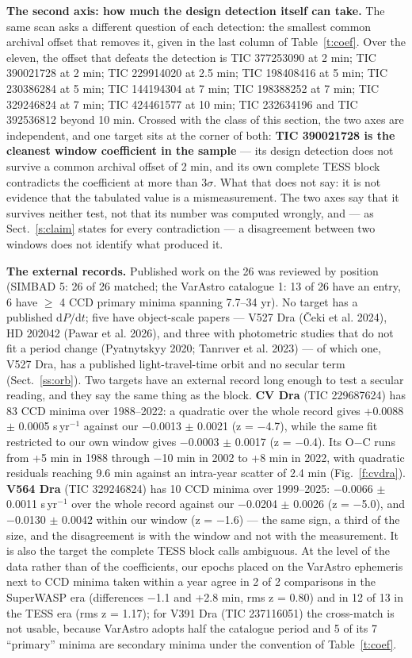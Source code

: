 \documentclass{aa}
\begin{document}
\textbf{The second axis: how much the design detection itself can take.} The same scan asks a different question of each detection: the smallest common archival offset that removes it, given in the last column of Table~\ref{t:coef}. Over the eleven, the offset that defeats the detection is TIC 377253090 at 2 min; TIC 390021728 at 2 min; TIC 229914020 at 2.5 min; TIC 198408416 at 5 min; TIC 230386284 at 5 min; TIC 144194304 at 7 min; TIC 198388252 at 7 min; TIC 329246824 at 7 min; TIC 424461577 at 10 min; TIC 232634196 and TIC 392536812 beyond 10 min. Crossed with the class of this section, the two axes are independent, and one target sits at the corner of both: \textbf{TIC 390021728 is the cleanest window coefficient in the sample} --- its design detection does not survive a common archival offset of 2 min, and its own complete TESS block contradicts the coefficient at more than 3$\sigma$. What that does not say: it is not evidence that the tabulated value is a mismeasurement. The two axes say that it survives neither test, not that its number was computed wrongly, and --- as Sect.~\ref{s:claim} states for every contradiction --- a disagreement between two windows does not identify what produced it.

\textbf{The external records.} Published work on the 26 was reviewed by position (SIMBAD 5\arcsec: 26 of 26 matched; the VarAstro catalogue 1\arcmin: 13 of 26 have an entry, 6 have $\ge$ 4 CCD primary minima spanning 7.7--34 yr). No target has a published $\mathrm{d}P/\mathrm{d}t$; five have object-scale papers --- V527 Dra (Čeki et al. 2024), HD 202042 (Pawar et al. 2026), and three with photometric studies that do not fit a period change (Pyatnytskyy 2020; Tanrıver et al. 2023) --- of which one, V527 Dra, has a published light-travel-time orbit and no secular term (Sect.~\ref{ss:orb}). Two targets have an external record long enough to test a secular reading, and they say the same thing as the block. \textbf{CV Dra} (TIC 229687624) has 83 CCD minima over 1988--2022: a quadratic over the whole record gives +0.0088 $\pm$ 0.0005 s\,yr$^{-1}$ against our $-$0.0013 $\pm$ 0.0021 (z = $-$4.7), while the same fit restricted to our own window gives $-$0.0003 $\pm$ 0.0017 (z = $-$0.4). Its O$-$C runs from +5 min in 1988 through $-$10 min in 2002 to +8 min in 2022, with quadratic residuals reaching 9.6 min against an intra-year scatter of 2.4 min (Fig.~\ref{f:cvdra}). \textbf{V564 Dra} (TIC 329246824) has 10 CCD minima over 1999--2025: $-$0.0066 $\pm$ 0.0011 s\,yr$^{-1}$ over the whole record against our $-$0.0204 $\pm$ 0.0026 (z = $-$5.0), and $-$0.0130 $\pm$ 0.0042 within our window (z = $-$1.6) --- the same sign, a third of the size, and the disagreement is with the window and not with the measurement. It is also the target the complete TESS block calls ambiguous. At the level of the data rather than of the coefficients, our epochs placed on the VarAstro ephemeris next to CCD minima taken within a year agree in 2 of 2 comparisons in the SuperWASP era (differences $-$1.1 and +2.8 min, rms z = 0.80) and in 12 of 13 in the TESS era (rms z = 1.17); for V391 Dra (TIC 237116051) the cross-match is not usable, because VarAstro adopts half the catalogue period and 5 of its 7 ``primary'' minima are secondary minima under the convention of Table~\ref{t:coef}.
\end{document}
